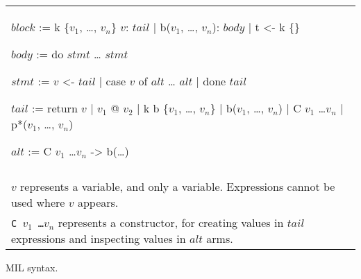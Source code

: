 \begin{myfig}[th]
\begin{tabular}{p{5in}}
\begin{center}
\begin{minipage}{4in}
\begin{AVerb}[numbers=left]
  $block$ := k \{$v_1$, \dots, $v_n$\} $v$: $tail$ \label{mil_k1_fig3} 
    | b($v_1$, \dots, $v_n$): $body$ \label{fig_mil3_b} 
    | t <- k \{\}  \label{mil_t_fig3} 

  $body$ := do \label{mil_body_fig3}
    $stmt$ 
    \dots 
    $stmt$

  $stmt$ := $v$ <- $tail$ \label{fig_mil3_stmt}  \label{mil_bind_fig3}
    | case $v$ of \label{mil_case_fig3}
        $alt$
        \dots
        $alt$
    | done $tail$ \label{mil_done_fig3}

  $tail$ := return $v$ \label{mil_return_fig3}
    | $v_1$ @ $v_2$ \label{mil_enter_fig3}
    | k b \{$v_1$, \dots, $v_n$\} \label{mil_capture_fig3}
    | b($v_1$, \dots, $v_n$) \label{mil_goto_fig3}
    | C $v_1$ \dots $v_n$ \label{mil_const_fig3}
    | p*($v_1$, \dots, $v_n$) \label{mil_prim_fig3}

  $alt$ := C $v_1$ \dots $v_n$ -> b(\dots) 
\end{AVerb}
\end{minipage}
\end{center} \\ \\
  $v$ represents a variable, and only a variable. Expressions
  cannot be used where $v$ appears. \\ 

  \texttt{C $v_1$ \dots $v_n$} represents a constructor, for creating
  values in $tail$ expressions and inspecting values in $alt$ arms. \\
\end{tabular}
\caption{MIL syntax.}
\label{mil_fig3}
\end{myfig}
